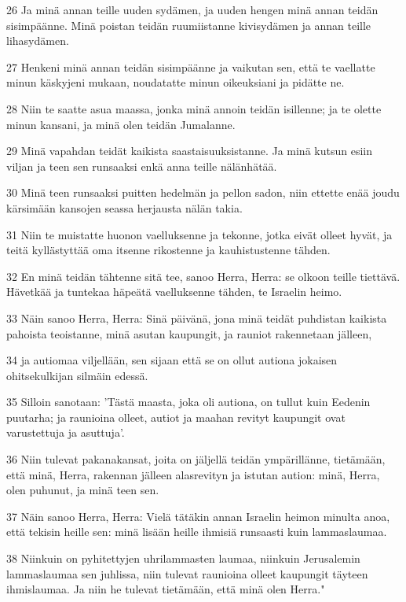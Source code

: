 \par 26 Ja minä annan teille uuden sydämen, ja uuden hengen minä annan teidän sisimpäänne. Minä poistan teidän ruumiistanne kivisydämen ja annan teille lihasydämen.
\par 27 Henkeni minä annan teidän sisimpäänne ja vaikutan sen, että te vaellatte minun käskyjeni mukaan, noudatatte minun oikeuksiani ja pidätte ne.
\par 28 Niin te saatte asua maassa, jonka minä annoin teidän isillenne; ja te olette minun kansani, ja minä olen teidän Jumalanne.
\par 29 Minä vapahdan teidät kaikista saastaisuuksistanne. Ja minä kutsun esiin viljan ja teen sen runsaaksi enkä anna teille nälänhätää.
\par 30 Minä teen runsaaksi puitten hedelmän ja pellon sadon, niin ettette enää joudu kärsimään kansojen seassa herjausta nälän takia.
\par 31 Niin te muistatte huonon vaelluksenne ja tekonne, jotka eivät olleet hyvät, ja teitä kyllästyttää oma itsenne rikostenne ja kauhistustenne tähden.
\par 32 En minä teidän tähtenne sitä tee, sanoo Herra, Herra: se olkoon teille tiettävä. Hävetkää ja tuntekaa häpeätä vaelluksenne tähden, te Israelin heimo.
\par 33 Näin sanoo Herra, Herra: Sinä päivänä, jona minä teidät puhdistan kaikista pahoista teoistanne, minä asutan kaupungit, ja rauniot rakennetaan jälleen,
\par 34 ja autiomaa viljellään, sen sijaan että se on ollut autiona jokaisen ohitsekulkijan silmäin edessä.
\par 35 Silloin sanotaan: 'Tästä maasta, joka oli autiona, on tullut kuin Eedenin puutarha; ja raunioina olleet, autiot ja maahan revityt kaupungit ovat varustettuja ja asuttuja'.
\par 36 Niin tulevat pakanakansat, joita on jäljellä teidän ympärillänne, tietämään, että minä, Herra, rakennan jälleen alasrevityn ja istutan aution: minä, Herra, olen puhunut, ja minä teen sen.
\par 37 Näin sanoo Herra, Herra: Vielä tätäkin annan Israelin heimon minulta anoa, että tekisin heille sen: minä lisään heille ihmisiä runsaasti kuin lammaslaumaa.
\par 38 Niinkuin on pyhitettyjen uhrilammasten laumaa, niinkuin Jerusalemin lammaslaumaa sen juhlissa, niin tulevat raunioina olleet kaupungit täyteen ihmislaumaa. Ja niin he tulevat tietämään, että minä olen Herra."


